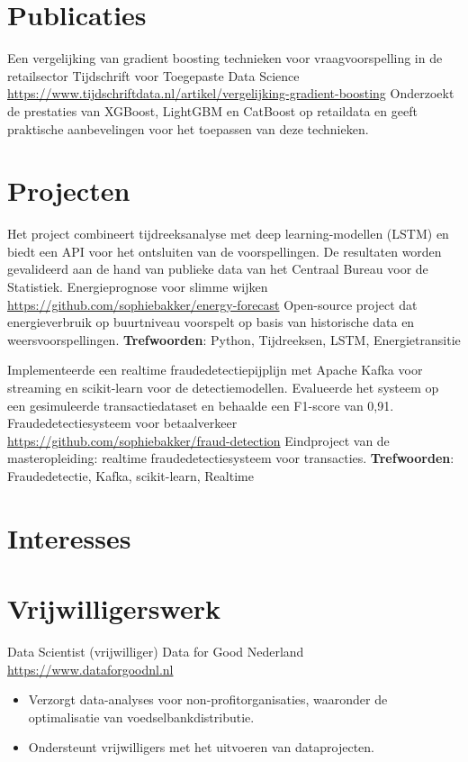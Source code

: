 \documentclass[a4paper, serif, 10pt]{moderncv}
\begin{document}
\section{Publicaties}

        {Een vergelijking van gradient boosting technieken voor vraagvoorspelling in de retailsector}
        {Tijdschrift voor Toegepaste Data Science}
        {\url{https://www.tijdschriftdata.nl/artikel/vergelijking-gradient-boosting}}
        {}
        {Onderzoekt de prestaties van XGBoost, LightGBM en CatBoost op retaildata en geeft praktische aanbevelingen voor het toepassen van deze technieken.}
\section{Projecten}

        {Het project combineert tijdreeksanalyse met deep learning-modellen (LSTM) en biedt een API voor het ontsluiten van de voorspellingen. De resultaten worden gevalideerd aan de hand van publieke data van het Centraal Bureau voor de Statistiek.
}
        {Energieprognose voor slimme wijken}
        {\url{https://github.com/sophiebakker/energy-forecast}}
        {}
        {Open-source project dat energieverbruik op buurtniveau voorspelt op basis van historische data en weersvoorspellingen.
\textbf{Trefwoorden}: Python, Tijdreeksen, LSTM, Energietransitie}

        {Implementeerde een realtime fraudedetectiepijplijn met Apache Kafka voor streaming en scikit-learn voor de detectiemodellen. Evalueerde het systeem op een gesimuleerde transactiedataset en behaalde een F1-score van 0,91.
}
        {Fraudedetectiesysteem voor betaalverkeer}
        {\url{https://github.com/sophiebakker/fraud-detection}}
        {}
        {Eindproject van de masteropleiding: realtime fraudedetectiesysteem voor transacties.
\textbf{Trefwoorden}: Fraudedetectie, Kafka, scikit-learn, Realtime}
\section{Interesses}

\section{Vrijwilligerswerk}

        {Data Scientist (vrijwilliger)}
        {Data for Good Nederland}
        {\url{https://www.dataforgoodnl.nl}}
        {}
        {\begin{itemize}
\item Verzorgt data-analyses voor non-profitorganisaties, waaronder de optimalisatie van voedselbankdistributie.
\item Ondersteunt vrijwilligers met het uitvoeren van dataprojecten.
\end{itemize}}
\end{document}
